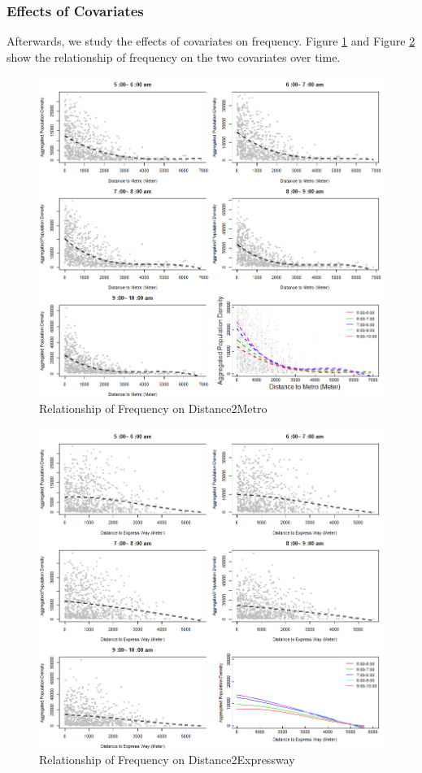 \documentclass[hidelinks,12pt]{article}
\begin{document}
	\subsubsection{Effects of Covariates}
	Afterwards, we study the effects of covariates on frequency. Figure \ref{fig:disme} and Figure \ref{fig:disex} show the relationship of frequency on the two covariates over time.
	\begin{figure}[!ht]
		\includegraphics[width=\textwidth]{dist2metro.png}
		\caption{Relationship of Frequency on Distance2Metro \label{fig:disme}}
	\end{figure}
	\begin{figure}[!ht]
		\includegraphics[width=\textwidth]{dist2express.png}
		\caption{Relationship of Frequency on Distance2Expressway \label{fig:disex}}
	\end{figure}
	
\end{document}
